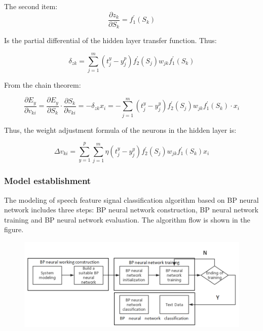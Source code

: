 \documentclass[12pt]{article}  %
\begin{document}
The second item:
\begin{equation}\label{eq:heat15}\frac{\partial z_{k}}{\partial S_{k}}=f_{1}^{\prime}\left(S_{k}\right)\end{equation}

Is the partial differential of the hidden layer transfer function.
Thus:

\begin{equation}\label{eq:heat15}\delta_{zk}=\sum_{j=1}^{m}\left(t_{j}^{y}-y_{j}^{p}\right) f_{2}^{\prime}\left(S_{j}\right) w_{j k} f_{1}^{\prime}\left(S_{k}\right)\end{equation}

From the chain theorem:

\begin{equation}\label{eq:heat15}\frac{\partial E_{y}}{\partial v_{k i}}=\frac{\partial E_{y}}{\partial S_{k}} \cdot \frac{\partial S_{k}}{\partial v_{k i}}=-\delta_{z k} x_{i}=-\sum_{j=1}^{m}\left(t_{j}^{y}-y_{j}^{y}\right) f_{2}^{\prime}\left(S_{j}\right) w_{j k} f_{1}^{\prime}\left(S_{k}\right) \cdot x_{i}\end{equation}

Thus, the weight adjustment formula of the neurons in the hidden layer is:

\begin{equation}\label{eq:heat15}\Delta v_{k i}=\sum_{y=1}^{p} \sum_{j=1}^{m} \eta\left(t_{j}^{y}-y_{j}^{y}\right) f_{2}^{\prime}\left(S_{j}\right) w_{j k} f_{1}^{\prime}\left(S_{k}\right) x_{i}\end{equation}

\subsubsection{Model establishment}

The modeling of speech feature signal classification algorithm based on BP neural network includes three steps: BP neural network construction, BP neural network training and BP neural network evaluation. The algorithm flow is shown in the figure.

\begin{figure}[h!]
\centering
\includegraphics[scale=1.0]{ppp.png}
\caption{}
\label{fig:bp3}
\end{figure}
\end{document}
